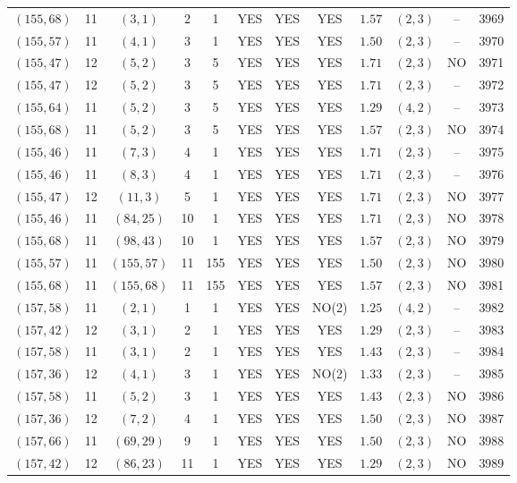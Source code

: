 \begin{longtable}{|c|c|c|c|c|c|c|c|c|c|c|c|}
$(155,68)$ & 11 & $(3,1)$ & 2 & 1 & YES & YES & YES & $1.57$ & $(2,3)$ & -- & 3969\\
$(155,57)$ & 11 & $(4,1)$ & 3 & 1 & YES & YES & YES & $1.50$ & $(2,3)$ & -- & 3970\\
$(155,47)$ & 12 & $(5,2)$ & 3 & 5 & YES & YES & YES & $1.71$ & $(2,3)$ & NO & 3971\\
$(155,47)$ & 12 & $(5,2)$ & 3 & 5 & YES & YES & YES & $1.71$ & $(2,3)$ & -- & 3972\\
$(155,64)$ & 11 & $(5,2)$ & 3 & 5 & YES & YES & YES & $1.29$ & $(4,2)$ & -- & 3973\\
$(155,68)$ & 11 & $(5,2)$ & 3 & 5 & YES & YES & YES & $1.57$ & $(2,3)$ & NO & 3974\\
$(155,46)$ & 11 & $(7,3)$ & 4 & 1 & YES & YES & YES & $1.71$ & $(2,3)$ & -- & 3975\\
$(155,46)$ & 11 & $(8,3)$ & 4 & 1 & YES & YES & YES & $1.71$ & $(2,3)$ & -- & 3976\\
$(155,47)$ & 12 & $(11,3)$ & 5 & 1 & YES & YES & YES & $1.71$ & $(2,3)$ & NO & 3977\\
$(155,46)$ & 11 & $(84,25)$ & 10 & 1 & YES & YES & YES & $1.71$ & $(2,3)$ & NO & 3978\\
$(155,68)$ & 11 & $(98,43)$ & 10 & 1 & YES & YES & YES & $1.57$ & $(2,3)$ & NO & 3979\\
$(155,57)$ & 11 & $(155,57)$ & 11 & 155 & YES & YES & YES & $1.50$ & $(2,3)$ & NO & 3980\\
$(155,68)$ & 11 & $(155,68)$ & 11 & 155 & YES & YES & YES & $1.57$ & $(2,3)$ & NO & 3981\\
$(157,58)$ & 11 & $(2,1)$ & 1 & 1 & YES & YES & NO(2) & $1.25$ & $(4,2)$ & -- & 3982\\
$(157,42)$ & 12 & $(3,1)$ & 2 & 1 & YES & YES & YES & $1.29$ & $(2,3)$ & -- & 3983\\
$(157,58)$ & 11 & $(3,1)$ & 2 & 1 & YES & YES & YES & $1.43$ & $(2,3)$ & -- & 3984\\
$(157,36)$ & 12 & $(4,1)$ & 3 & 1 & YES & YES & NO(2) & $1.33$ & $(2,3)$ & -- & 3985\\
$(157,58)$ & 11 & $(5,2)$ & 3 & 1 & YES & YES & YES & $1.43$ & $(2,3)$ & NO & 3986\\
$(157,36)$ & 12 & $(7,2)$ & 4 & 1 & YES & YES & YES & $1.50$ & $(2,3)$ & NO & 3987\\
$(157,66)$ & 11 & $(69,29)$ & 9 & 1 & YES & YES & YES & $1.50$ & $(2,3)$ & NO & 3988\\
$(157,42)$ & 12 & $(86,23)$ & 11 & 1 & YES & YES & YES & $1.29$ & $(2,3)$ & NO & 3989\\

\end{longtable}
